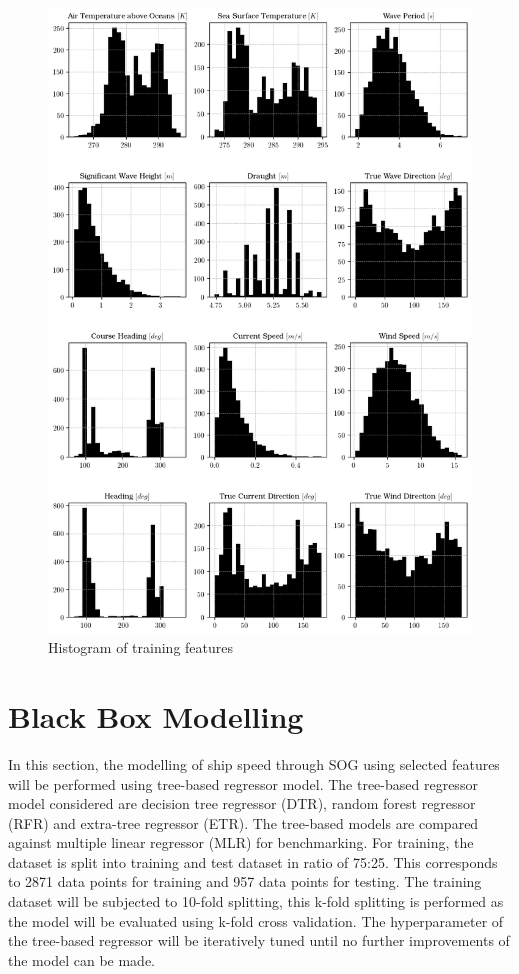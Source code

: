 \begin{figure}
    \centering
    \includegraphics[width=.9\linewidth]{02_figures/hist_init_preprocessing.png}
    \caption{Histogram of training features}
    \label{fig:hist_training_ftr_label}
\end{figure}

\pagebreak

\section{Black Box Modelling}\label{sec:BBM_modelling}

In this section, the modelling of ship speed through SOG using selected features will be performed using tree-based regressor model. The tree-based regressor model considered are decision tree regressor (DTR), random forest regressor (RFR) and extra-tree regressor (ETR). The tree-based models are compared against multiple linear regressor (MLR) for benchmarking. For training, the dataset is split into training and test dataset in ratio of 75:25. This corresponds to 2871 data points for training and 957 data points for testing. The training dataset will be subjected to 10-fold splitting, this k-fold splitting is performed as the model will be evaluated using k-fold cross validation. The hyperparameter of the tree-based regressor will be iteratively tuned until no further improvements of the model can be made.\\


